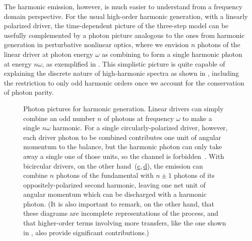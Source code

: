The harmonic emission, however, is much easier to understand from a frequency domain perspective. For the usual high-order harmonic generation, with a linearly polarized driver, the time-dependent picture of the three-step model can be usefully complemented by a photon picture analogous to the ones from harmonic generation in perturbative nonlinear optics, where we envision $n$ photons of the linear driver at photon energy $\omega$ as combining to form a single harmonic photon at energy $n\omega$, as exemplified in . This simplistic picture is quite capable of explaining the discrete nature of high-harmonic spectra as shown in , including the restriction to only odd harmonic orders once we account for the conservation of photon parity.






\begin{figure}[b!]
  \centering
  \subfigure[]{
    
    \label{f8-initial-photon-diagrams-a}
  }
  \hspace{5mm}
  \subfigure[]{
    
    \label{f8-initial-photon-diagrams-b}
  }
  \hspace{5mm}
  \subfigure[]{
    
    \label{f8-initial-photon-diagrams-c}
  }
  \hspace{5mm}
  \subfigure[]{
    
    \label{f8-initial-photon-diagrams-d}
  }
  \hspace{5mm}
  \subfigure[]{
    
    \label{f8-initial-photon-diagrams-e}
  }
  
  \caption[
  Photon pictures for harmonic generation in linear, circular and bicircular fields
  ]{
  Photon pictures for harmonic generation. Linear drivers \protect{} can simply combine an odd number $n$ of photons at frequency $\omega$ to make a single $n\omega$ harmonic. For a single circularly-polarized driver, however, each driver photon to be combined contributes one unit of angular momentum to the balance, but the harmonic photon can only take away a single one of those units, so the channel is forbidden~\protect{}. With bicircular drivers, on the other hand~(\hyperref[f8-initial-photon-diagrams-c]{c},\,\hyperref[f8-initial-photon-diagrams-d]{d}), the emission can combine $n$ photons of the fundamental with $n\pm1$ photons of its oppositely-polarized second harmonic, leaving one net unit of angular momentum which can be discharged with a harmonic photon. (It is also important to remark, on the other hand, that these diagrams are incomplete representations of the process, and that higher-order terms involving more transfers, like the one shown in \protect{}, also provide significant contributions.)
  }
\label{f8-initial-photon-diagrams}
\end{figure}




